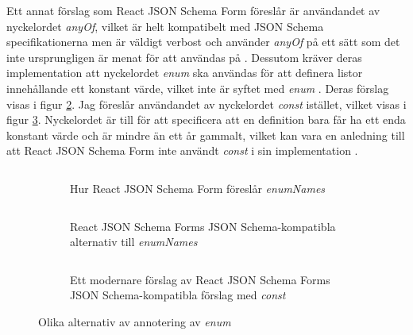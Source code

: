 Ett annat förslag som React JSON Schema Form föreslår är användandet av nyckelordet \textit{anyOf}, vilket är helt kompatibelt med JSON Schema specifikationerna men är väldigt verbost och använder \textit{anyOf} på ett sätt som det inte ursprungligen är menat för att användas på \cite{MozillaServices, Andrews2018}. Dessutom kräver deras implementation att nyckelordet \textit{enum} ska användas för att definera listor innehållande ett konstant värde, vilket inte är syftet med \textit{enum} \cite{Andrews2018}. Deras förslag visas i figur \ref{fig:enum-example:any-of}. Jag föreslår användandet av nyckelordet \textit{const} istället, vilket visas i figur \ref{fig:enum-example:any-of-const}. Nyckelordet är till för att specificera att en definition bara får ha ett enda konstant värde och är mindre än ett år gammalt, vilket kan vara en anledning till att React JSON Schema Form inte användt \textit{const} i sin implementation \cite{Andrews2018}.

\begin{figure}
	\begin{subfigure}[t]{\textwidth}
		\inputminted[tabsize=2, frame=single, fontsize=\small, framesep=2mm, breaklines]{json}{code/enum-example/extra-array.json}
		\vspace{-1.2em}
		\caption{Hur React JSON Schema Form föreslår \textit{enumNames} \cite{MozillaServices}}
		\label{fig:enum-example:extra-array}
		\vspace{.8em}
	\end{subfigure}
	\begin{subfigure}[t]{0.47\textwidth}
		\inputminted[tabsize=2, frame=single, fontsize=\small, framesep=2mm, breaklines]{json}{code/enum-example/any-of.json}
		\vspace{-1.2em}
		\caption{React JSON Schema Forms JSON Schema-kompatibla alternativ till \textit{enumNames} \cite{MozillaServices}}
		\label{fig:enum-example:any-of}
	\end{subfigure}\hfill
	\begin{subfigure}[t]{0.47\textwidth}
		\inputminted[tabsize=2, frame=single, fontsize=\small, framesep=2mm, breaklines]{json}{code/enum-example/any-of-const.json}
		\vspace{-1.2em}
		\caption{Ett modernare förslag av React JSON Schema Forms JSON Schema-kompatibla förslag med \textit{const}}
		\label{fig:enum-example:any-of-const}
	\end{subfigure}
	\caption{Olika alternativ av annotering av \textit{enum}}
	\label{fig:enum-example:any-of-examples}
\end{figure}


